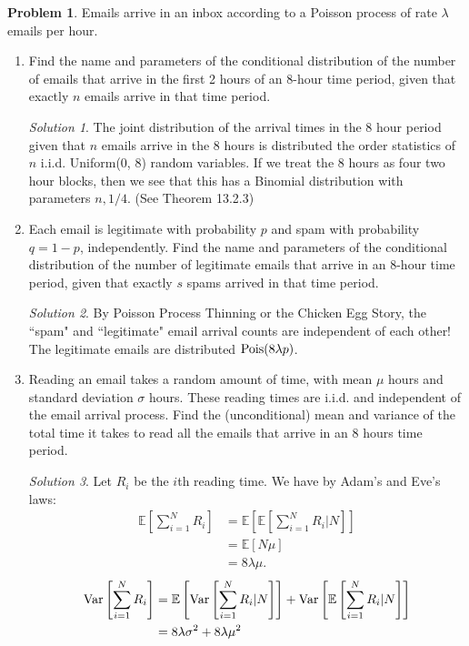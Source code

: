 \documentclass[11pt]{article}
\theoremstyle{definition}
\newtheorem{prob}[theo]{\color{Maroon} Problem}
\theoremstyle{remark}
\newtheorem*{soln}{\color{Maroon} Solution}
\newcommand{\E}[1]{\mathbb{E}\left[ #1 \right]}
\renewcommand{\var}[1]{\textnormal{Var}\left[ #1 \right]}
\newcommand{\Pois}{\textnormal{Pois}}
\begin{document}
\begin{prob} Emails arrive in an inbox according to a Poisson process of rate $\lambda$ emails per hour.

\begin{enumerate}[label = (\alph*)]
    \item Find the name and parameters of the conditional distribution of the number of emails that arrive in the first 2 hours of an $8$-hour time period, given that exactly $n$ emails arrive in that time period.
    
    \begin{soln} 
    The joint distribution of the arrival times in the $8$ hour period given that $n$ emails arrive in the $8$ hours is distributed the order statistics of $n$ i.i.d. Uniform(0, 8) random variables. If we treat the $8$ hours as four two hour blocks, then we see that this has a Binomial distribution with parameters $n, 1/4$. (See Theorem 13.2.3)
    \end{soln}
    
    \dotfill
    
    \item Each email is legitimate with probability $p$ and spam with probability $q = 1 - p$, independently. Find the name and parameters of the conditional distribution of the number of legitimate emails that arrive in an $8$-hour time period, given that exactly $s$ spams arrived in that time period.
    
    \begin{soln} By Poisson Process Thinning or the Chicken Egg Story, the ``spam" and ``legitimate" email arrival counts are independent of each other! The legitimate emails are distributed $\Pois(8\lambda p)$.
    \end{soln}
    
    \dotfill
    
    \item Reading an email takes a random amount of time, with mean $\mu$ hours and standard deviation $\sigma$ hours. These reading times are i.i.d. and independent of the email arrival process. Find the (unconditional) mean and variance of the total time it takes to read all the emails that arrive in an $8$ hours time period.
    
    \begin{soln} Let $R_i$ be the $i$th reading time. We have by Adam's and Eve's laws:
    \begin{align*}
        \E{\sum_{i=1}^N R_i}
        &= \E{\E{\sum_{i=1}^N R_i | N}} \\
        &= \E{N\mu} \\
        &= 8\lambda \mu.
    \end{align*}
    \begin{align*}
        \var{\sum_{i=1}^N R_i} &= \E{\var{\sum_{i=1}^N R_i | N}} + \var{\E{\sum_{i=1}^N R_i | N}} \\
        &= 8\lambda \sigma^2 + 8\lambda \mu^2
    \end{align*}
    \end{soln}
    
\end{enumerate}

\end{prob}
\end{document}
